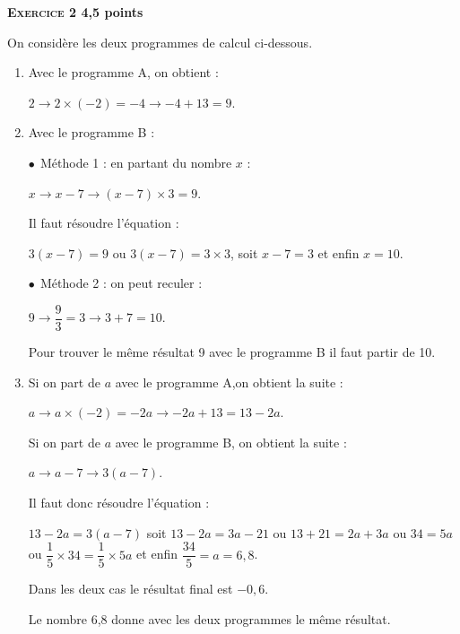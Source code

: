 \textbf{\textsc{Exercice 2} \hfill 4,5 points}

\medskip

On considère les deux programmes de calcul ci-dessous. 


\begin{enumerate}
\item %
Avec le programme A, on obtient :

$2 \to 2 \times (- 2) = - 4 \to - 4 + 13 = 9$. 
\item %
Avec le programme B :

$\bullet~~$Méthode 1 : en partant du nombre $x$ :

$x \to x - 7 \to (x - 7) \times 3 = 9$.

Il faut résoudre l'équation :

$3(x - 7) = 9$ ou $3(x - 7) = 3\times 3$, soit $x - 7 = 3$ et enfin $x = 10$.

$\bullet~~$Méthode 2 : on peut \og reculer \fg{} :

$9 \to \dfrac{9}{3} = 3 \to 3 + 7 = 10$.

Pour trouver le même résultat 9 avec le programme B il faut partir de 10. 
\item %
Si on part de $a$ avec le programme A,on obtient la suite :

$a \to a \times (- 2) = - 2a \to - 2a + 13 = 13 - 2a$.

Si on part de $a$ avec le programme B, on obtient la suite :

$a \to a - 7  \to 3(a - 7)$.

Il faut donc résoudre l'équation :

$13 - 2a = 3(a - 7)$ soit $13 - 2a = 3a - 21$ ou $13 + 21 = 2a + 3a$ ou $34 = 5a$ ou  $\dfrac{1}{5}\times 34 = \dfrac{1}{5}\times 5a$ et enfin $\dfrac{34}{5} = a = 6,8$.

Dans les deux cas le résultat final est $- 0,6$.

Le nombre 6,8 donne avec les deux programmes le même résultat.
\end{enumerate} 

\bigskip


